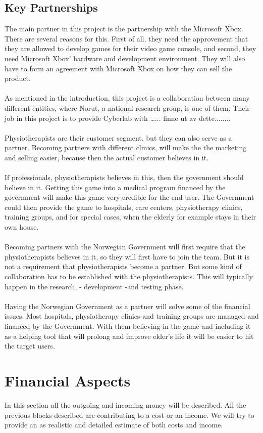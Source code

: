 \subsection{Key Partnerships}
The main partner in this project is the partnership with the Microsoft Xbox. There are several reasons for this. First of all, they need the approvement that they are allowed to develop games for their video game console, and second, they need Microsoft Xbox’ hardware and development environment. They will also have to form an agreement with Microsoft Xbox on how they can sell the product. \\ \\ As mentioned in the introduction, this project is a collaboration between many different entities, where Norut, a national research group, is one of them. Their job in this project is to provide Cyberlab with …... finne ut av dette........ \\ \\ Physiotherapists are their customer segment, but they can also serve as a partner. Becoming partners with different clinics, will make the the marketing and selling easier, because then the actual customer believes in it. \\ \\ If professionals, physiotherapists believes in this, then the government should believe in it. Getting this game into a medical program financed by the government will make this game very credible for the end user. The Government could then provide the game to hospitals, care centers, physiotherapy clinics, training groups, and for special cases, when the elderly for example stays in their own house. \\ \\ Becoming partners with the Norwegian Government will first require that the physiotherapists believes in it, so they will first have to join the team. But it is not a requirement that physiotherapists become a partner. But some kind of collaboration has to be established with the physiotherapists. This will typically happen in the research, - development -and testing phase. \\ \\ Having the Norwegian Government as a partner will solve some of the financial issues. Most hospitals, physiotherapy clinics and training groups are managed and financed by the Government. With them believing in the game and including it as a helping tool that will prolong and improve elder's life it will be easier to hit the target users. 
\section{Financial Aspects}
In this section all the outgoing and incoming money will be described. All the previous blocks described are contributing to a cost or an income. We will try to provide an as realistic and detailed estimate of both costs and income.
